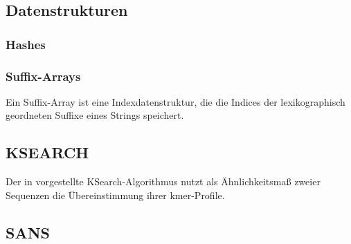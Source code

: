 \documentclass{article}
\begin{document}
\subsection{Datenstrukturen}

\subsubsection{Hashes}%

\subsubsection{Suffix-Arrays}

Ein Suffix-Array ist eine Indexdatenstruktur, die die Indices der lexikographisch geordneten Suffixe eines Strings speichert. %

\subsection{KSEARCH}
\label{ksearch}

Der in \cite{Holm} vorgestellte KSearch-Algorithmus nutzt als Ähnlichkeitsmaß zweier Sequenzen die Übereinstimmung ihrer kmer-Profile.%


\subsection{SANS}
\label{sans}
\end{document}
